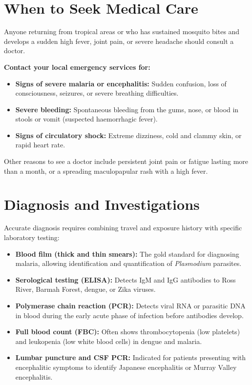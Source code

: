 \section*{When to Seek Medical Care}
Anyone returning from tropical areas or who has sustained mosquito bites and develops a sudden high fever, joint pain, or severe headache should consult a doctor.

\textbf{Contact your local emergency services for:}
\begin{itemize}
    \item \textbf{Signs of severe malaria or encephalitis:} Sudden confusion, loss of consciousness, seizures, or severe breathing difficulties.
    \item \textbf{Severe bleeding:} Spontaneous bleeding from the gums, nose, or blood in stools or vomit (suspected haemorrhagic fever).
    \item \textbf{Signs of circulatory shock:} Extreme dizziness, cold and clammy skin, or rapid heart rate.
\end{itemize}
Other reasons to see a doctor include persistent joint pain or fatigue lasting more than a month, or a spreading maculopapular rash with a high fever.

\section*{Diagnosis and Investigations}
Accurate diagnosis requires combining travel and exposure history with specific laboratory testing:
\begin{itemize}
    \item \textbf{Blood film (thick and thin smears):} The gold standard for diagnosing malaria, allowing identification and quantification of \textit{Plasmodium} parasites.
    \item \textbf{Serological testing (ELISA):} Detects IgM and IgG antibodies to Ross River, Barmah Forest, dengue, or Zika viruses.
    \item \textbf{Polymerase chain reaction (PCR):} Detects viral RNA or parasitic DNA in blood during the early acute phase of infection before antibodies develop.
    \item \textbf{Full blood count (FBC):} Often shows thrombocytopenia (low platelets) and leukopenia (low white blood cells) in dengue and malaria.
    \item \textbf{Lumbar puncture and CSF PCR:} Indicated for patients presenting with encephalitic symptoms to identify Japanese encephalitis or Murray Valley encephalitis.
\end{itemize}

